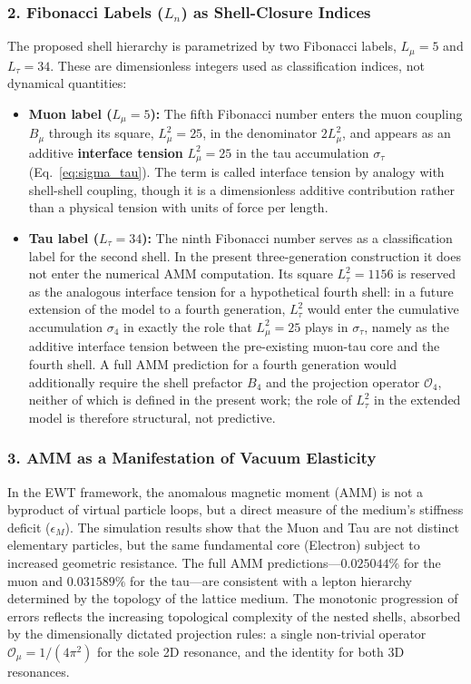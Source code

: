 \documentclass[10pt,a4paper]{article}
\begin{document}
\subsubsection*{2. Fibonacci Labels ($L_n$) as Shell-Closure Indices}
The proposed shell hierarchy is parametrized by two Fibonacci labels,
$L_{\mu} = 5$ and $L_{\tau} = 34$. These are dimensionless integers
used as classification indices, not dynamical quantities:
\begin{itemize}
	\item \textbf{Muon label ($L_{\mu} = 5$):} The fifth Fibonacci number
	enters the muon coupling $B_\mu$ through its square, $L_\mu^2 = 25$,
	in the denominator $2L_\mu^2$, and appears as an additive
	\textbf{interface tension} $L_\mu^2 = 25$ in the tau accumulation
	$\sigma_\tau$ (Eq.~\eqref{eq:sigma_tau}). The term is called
	interface tension by analogy with shell-shell coupling, though it is
	a dimensionless additive contribution rather than a physical tension
	with units of force per length.
	\item \textbf{Tau label ($L_{\tau} = 34$):} The ninth Fibonacci
	number serves as a classification label for the second shell. In
	the present three-generation construction it does not enter the
	numerical AMM computation. Its square $L_\tau^2 = 1156$ is reserved
	as the analogous interface tension for a hypothetical fourth shell:
	in a future extension of the model to a fourth generation, $L_\tau^2$
	would enter the cumulative accumulation $\sigma_4$ in exactly the
	role that $L_\mu^2 = 25$ plays in $\sigma_\tau$, namely as the
	additive interface tension between the pre-existing muon-tau core
	and the fourth shell. A full AMM prediction for a fourth generation
	would additionally require the shell prefactor $B_4$ and the
	projection operator $\mathcal{O}_4$, neither of which is defined in
	the present work; the role of $L_\tau^2$ in the extended model is
	therefore structural, not predictive.
\end{itemize}

\subsubsection*{3. AMM as a Manifestation of Vacuum Elasticity}
In the EWT framework, the anomalous magnetic moment (AMM) is not a byproduct of virtual particle loops, but a direct measure of the medium's stiffness deficit ($\epsilon_M$). The simulation results show that the Muon and Tau are not distinct elementary particles, but the same fundamental core (Electron) subject to increased geometric resistance. The full AMM predictions---$0.025044\%$ for the muon and $0.031589\%$ for
the tau---are consistent with a lepton hierarchy determined by the topology of the lattice medium. The monotonic progression of errors
reflects the increasing topological complexity of the nested shells,
absorbed by the dimensionally dictated projection rules: a single
non-trivial operator $\mathcal{O}_\mu = 1/(4\pi^2)$ for the sole 2D
resonance, and the identity for both 3D resonances.
\end{document}
